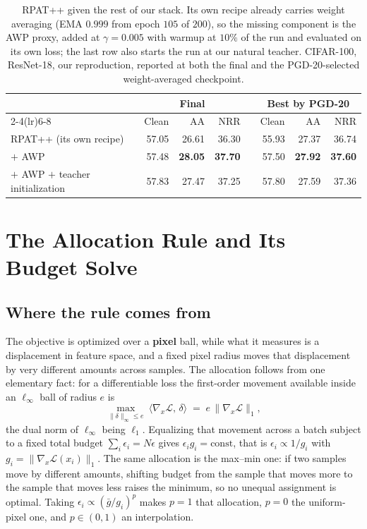 \documentclass{article} %
\theoremstyle{plain}
\begin{document}
\begin{table}[!htbp]
  \centering \small \setlength{\tabcolsep}{4.5pt}
  \caption{RPAT++ given the rest of our stack. Its own recipe already carries weight averaging (EMA
  $0.999$ from epoch $105$ of $200$), so the missing component is the AWP proxy, added at
  $\gamma = 0.005$ with warmup at $10\%$ of the run and evaluated on its own loss; the last row also
  starts the run at our natural teacher. CIFAR-100, ResNet-18, our reproduction, reported at both the
  final and the PGD-20-selected weight-averaged checkpoint.}
  \label{tab:rpatstack}
  \begin{tabular}{lrrrcrrr}
    \toprule
    & \multicolumn{3}{c}{Final} & & \multicolumn{3}{c}{Best by PGD-20} \\
    \cmidrule(lr){2-4}\cmidrule(lr){6-8}
    & Clean & AA & NRR & & Clean & AA & NRR \\
    \midrule
    RPAT++ (its own recipe)   & 57.05 & 26.61 & 36.30 & & 55.93 & 27.37 & 36.74 \\
    \quad $+$ AWP             & 57.48 & \textbf{28.05} & \textbf{37.70} & & 57.50 & \textbf{27.92} & \textbf{37.60} \\
    \quad $+$ AWP $+$ teacher initialization & 57.83 & 27.47 & 37.25 & & 57.80 & 27.59 & 37.36 \\
    \bottomrule
  \end{tabular}
\end{table}

\section{The Allocation Rule and Its Budget Solve}
\label{app:box}

\subsection{Where the rule comes from}

The objective is optimized over a \textbf{pixel} ball, while what it measures is a displacement in
feature space, and a fixed pixel radius moves that displacement by very different amounts across
samples. The allocation follows from one elementary fact: for a differentiable loss the first-order
movement available inside an $\ell_\infty$ ball of radius $e$ is
\begin{equation}
\max_{\lVert\delta\rVert_\infty \le e}\ \langle \nabla_x \mathcal{L},\, \delta\rangle
\;=\; e\,\lVert \nabla_x \mathcal{L}\rVert_1 ,
\label{eqn:dual}
\end{equation}
the dual norm of $\ell_\infty$ being $\ell_1$. Equalizing that movement across a batch subject to a
fixed total budget $\sum_i \epsilon_i = N\epsilon$ gives $\epsilon_i g_i = \mathrm{const}$, that is
$\epsilon_i \propto 1/g_i$ with $g_i = \lVert\nabla_x\mathcal{L}(x_i)\rVert_1$. The same allocation is
the max--min one: if two samples move by different amounts, shifting budget from the sample that moves
more to the sample that moves less raises the minimum, so no unequal assignment is optimal. Taking
$\epsilon_i \propto (\bar g/g_i)^p$ makes $p=1$ that allocation, $p=0$ the uniform-pixel one, and
$p \in (0,1)$ an interpolation.
\end{document}
